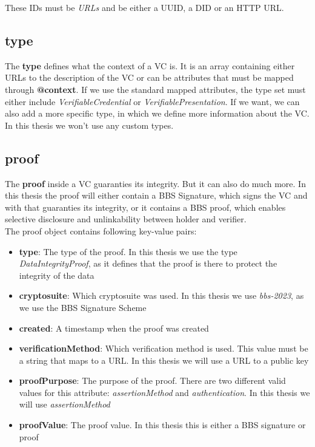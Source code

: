 \documentclass[
	a4paper               %
	,BCOR=0mm            %
	,bibliography=totoc   %
	,listof=totoc         %
	,monolingual
	,twoside=false
]{bfhthesis}              %
\begin{document}
These IDs must be \textit{URLs} and be either a UUID, a DID or an HTTP URL.

\subsection{type}

The \textbf{type} defines what the context of a VC is. 
It is an array containing either URLs to the description of the VC or can be attributes that must be mapped through \textbf{@context}.
If we use the standard mapped attributes, the type set must either include \textit{VerifiableCredential} or \textit{VerifiablePresentation}.
If we want, we can also add a more specific type, in which we define more information about the VC.\\
In this thesis we won't use any custom types.

\subsection{proof}
\label{subsec:vcproof}
The \textbf{proof} inside a VC guaranties its integrity. But it can also do much more.
In this thesis the proof will either contain a BBS Signature, which signs the VC and with that guaranties its integrity, or it contains a BBS proof, which enables selective disclosure and unlinkability between holder and verifier.\\
The proof object contains following key-value pairs:
\begin{itemize}
	\item \textbf{type}: The type of the proof. In this thesis we use the type \textit{DataIntegrityProof}, as it defines that the proof is there to protect the integrity of the data
	\item \textbf{cryptosuite}: Which cryptosuite was used. In this thesis we use \textit{bbs-2023}, as we use the BBS Signature Scheme
	\item \textbf{created}: A timestamp when the proof was created
	\item \textbf{verificationMethod}: Which verification method is used. This value must be a string that maps to a URL. In this thesis we will use a URL to a public key
	\item \textbf{proofPurpose}: The purpose of the proof. There are two different valid values for this attribute: \textit{assertionMethod} and \textit{authentication}. In this thesis we will use \textit{assertionMethod}
	\item \textbf{proofValue}: The proof value. In this thesis this is either a BBS signature or proof
\end{itemize}
\end{document}
